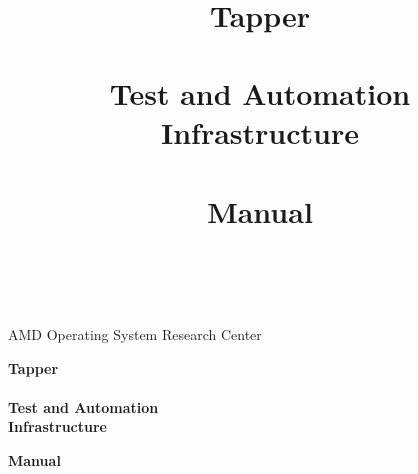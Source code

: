 \documentclass[11pt,a4paper,twoside,DIV15,headinclude,footinclude=false,headsepline]{scrartcl}
\begin{document}

\thispagestyle{empty}

\vspace*{1\baselineskip}

\begin{center}

 {\Large
   AMD Operating System Research Center \\
 }

 \vspace*{6\baselineskip}

 \textbf{\Huge
  Tapper \\
  ~ \\
  Test and Automation \\
  Infrastructure \\
 }

 \vspace*{19\baselineskip}
 \textbf{\Huge Manual}
\end{center}

%

\newpage

\thispagestyle{empty}

~

\newpage


\thispagestyle{empty}

\title{
 \vspace*{2\baselineskip}
 ~ \\
 ~ \\
 Tapper \\
 ~ \\
 Test and Automation \\
 Infrastructure \\
 ~ \\
 Manual
}
\date{
 ~ \\
 \vspace*{8\baselineskip}
}
\publishers{
 AMD Operating System Research Center \\
 Steffen Schwigon, Maik Hentsche \\
 Copyright 2008-2012
}
\end{document}
